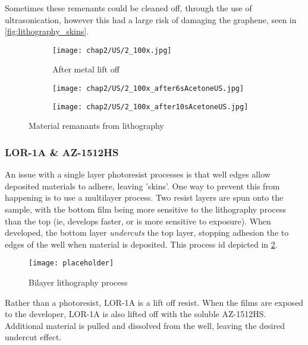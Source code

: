 \documentclass[../Matt_Gebert_Honours_Thesis.tex]{subfiles}
\begin{document}
	Sometimes these remenants could be cleaned off, through the use of ultrasonication, however this had a large risk of damaging the graphene, seen in \cref{fig:lithography_skins}.
	
	
	\begin{figure}[H]
		\centering
		\begin{subfigure}[b]{0.3\textwidth}
			\texttt{[image: chap2/US/2\_100x.jpg]}
			\caption{After metal lift off}			
		\end{subfigure}
		\begin{subfigure}[b]{0.3\textwidth}
			\texttt{[image: chap2/US/2\_100x\_after6sAcetoneUS.jpg]}
		\end{subfigure}
		\begin{subfigure}[b]{0.3\textwidth}
			\texttt{[image: chap2/US/2\_100x\_after10sAcetoneUS.jpg]}
		\end{subfigure}
		\caption{Material remanants from lithography}\label{fig:lithography_skins_us}
	\end{figure}
	
	\subsubsection{LOR-1A \& AZ-1512HS}
	An issue with a single layer photoresist processes is that well edges allow deposited materials to adhere, leaving 'skins'. One way to prevent this from happening is to use a multilayer process. Two resist layers are spun onto the sample, with the bottom film being more sensitive to the lithography process than the top (ie, develops faster, or is more sensitive to exposure). When developed, the bottom layer \textit{undercuts} the top layer, stopping adhesion the to edges of the well when material is deposited. This process id depicted in \cref{fig:bilayer_lithography}.
	
	\begin{figure}[H]
		\centering
		\texttt{[image: placeholder]}
		\caption{Bilayer lithography process}\label{fig:bilayer_lithography}
	\end{figure}
	
	Rather than a photoresist, LOR-1A is a lift off resist. When the films are exposed to the developer, LOR-1A is also lifted off with the soluble AZ-1512HS. Additional material is pulled and dissolved from the well, leaving the desired undercut effect. %
	
\end{document}
